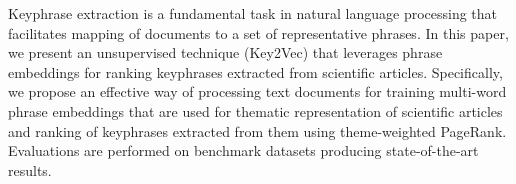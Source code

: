 Keyphrase extraction is a fundamental task in natural language processing that facilitates mapping of documents to a set of representative phrases. In this paper, we present an unsupervised technique (Key2Vec)  that leverages phrase embeddings for ranking keyphrases extracted from scientific articles. Specifically, we propose an effective way of processing text documents for training multi-word phrase embeddings that are used for thematic representation of scientific articles and ranking of keyphrases extracted from them using theme-weighted PageRank. Evaluations are performed on benchmark datasets producing state-of-the-art results.
